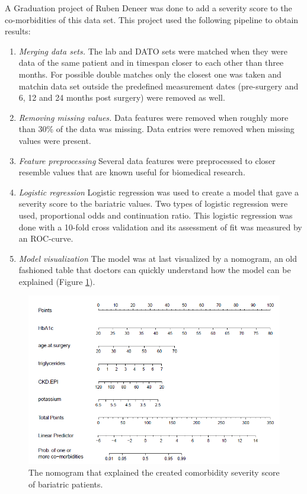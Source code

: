 \documentclass[10pt,a4paper]{article}
\begin{document}
	A Graduation project of Ruben Deneer was done to add a severity score to the co-morbidities of this data set. This project used the following pipeline to obtain results:
	
	\begin{enumerate}
		\item \textit{Merging data sets.} The lab and DATO sets were matched when they were data of the same patient and in timespan closer to each other than three months. For possible double matches only the closest one was taken and matchin data set outside the predefined measurement dates (pre-surgery and 6, 12 and 24 months post surgery) were removed as well.
		\item \textit{Removing missing values.} Data features were removed when roughly more than 30\% of the data was missing. Data entries were removed when missing values were present.
		\item \textit{Feature preprocessing} Several data features were preprocessed to closer resemble values that are known useful for biomedical research.
		\item \textit{Logistic regression} Logistic regression was used to create a model that gave a severity score to the bariatric values. Two types of logistic regression were used, proportional odds and continuation ratio. This logistic regression was done with a 10-fold cross validation and its assessment of fit was measured by an ROC-curve.
		\item \textit{Model visualization} The model was at last visualized by a nomogram, an old fashioned table that doctors can quickly understand how the model can be explained (Figure \ref{fig:BariatricNomogram}).
	\end{enumerate}
	
	\begin{figure}[h!]
		\includegraphics[scale=0.8]{BariatricNomogram.png}
		\caption{The nomogram that explained the created comorbidity severity score of bariatric patients.\cite{Deneer2017Thesis}}
		\label{fig:BariatricNomogram}
	\end{figure}
	
\end{document}
